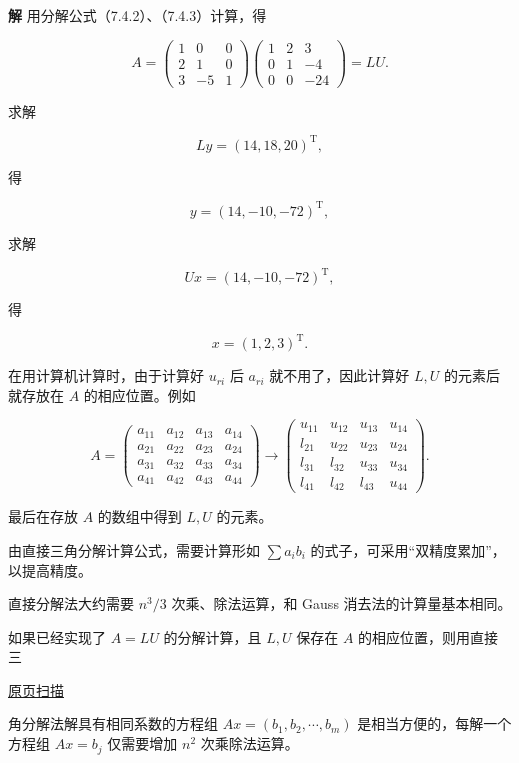 \documentclass[
  10pt,
  fontset=fandol]{ctexart}
\begin{document}
\textbf{解} 用分解公式（7.4.2）、（7.4.3）计算，得

\[A=\begin{pmatrix}1&0&0\\2&1&0\\3&-5&1\end{pmatrix}
\begin{pmatrix}1&2&3\\0&1&-4\\0&0&-24\end{pmatrix}=LU.\]

求解

\[Ly=(14,18,20)^{\mathrm T},\]

得

\[y=(14,-10,-72)^{\mathrm T},\]

求解

\[Ux=(14,-10,-72)^{\mathrm T},\]

得

\[x=(1,2,3)^{\mathrm T}.\]

在用计算机计算时，由于计算好 \(u_{ri}\) 后 \(a_{ri}\) 就不用了，因此计算好 \(L,U\) 的元素后就存放在 \(A\) 的相应位置。例如

\[
A=\begin{pmatrix}
a_{11}&a_{12}&a_{13}&a_{14}\\
a_{21}&a_{22}&a_{23}&a_{24}\\
a_{31}&a_{32}&a_{33}&a_{34}\\
a_{41}&a_{42}&a_{43}&a_{44}
\end{pmatrix}
\to\begin{pmatrix}
u_{11}&u_{12}&u_{13}&u_{14}\\
l_{21}&u_{22}&u_{23}&u_{24}\\
l_{31}&l_{32}&u_{33}&u_{34}\\
l_{41}&l_{42}&l_{43}&u_{44}
\end{pmatrix}.
\]

最后在存放 \(A\) 的数组中得到 \(L,U\) 的元素。

由直接三角分解计算公式，需要计算形如 \(\sum a_i b_i\) 的式子，可采用``双精度累加''，以提高精度。

直接分解法大约需要 \(n^3/3\) 次乘、除法运算，和 Gauss 消去法的计算量基本相同。

如果已经实现了 \(A=LU\) 的分解计算，且 \(L,U\) 保存在 \(A\) 的相应位置，则用直接三

\href{../../source-images/pdf-193.jpeg}{原页扫描}

角分解法解具有相同系数的方程组 \(Ax=(b_1,b_2,\cdots,b_m)\) 是相当方便的，每解一个方程组 \(Ax=b_j\) 仅需要增加 \(n^2\) 次乘除法运算。
\end{document}
